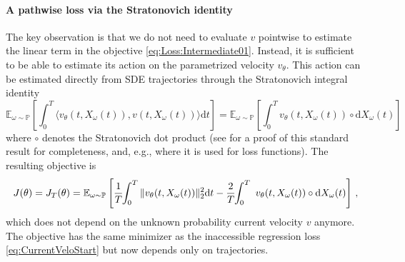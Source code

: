 \documentclass[oneside,11pt]{article}
\theoremstyle{remark}
\begin{document}
\paragraph{A pathwise loss via the Stratonovich identity}
The key observation is that we do not need to evaluate $v$ pointwise to estimate the linear term in the objective \eqref{eq:Loss:Intermediate01}. Instead, it is sufficient to be able to estimate its action on the parametrized velocity $v_{\theta}$. 
This action can be estimated directly from SDE trajectories through the Stratonovich integral identity
\begin{equation}\label{eq:StratExp}
\mathbb{E}_{\omega \sim \mathbb{P}} \left[\int_0^T \langle v_\theta(t, X_{\omega}(t)), v(t, X_{\omega}(t)) \rangle \mathrm{d} t\right] = \mathbb{E}_{\omega \sim \mathbb{P}} \left[ \int_0^T v_\theta(t, X_{\omega}(t)) \circ \mathrm{d} X_{\omega}(t) \right] 
\end{equation}
where $\circ$ denotes the Stratonovich dot product (see  for a proof of this standard result for completeness, and, e.g.,  \cite{frishman-ronceray:2020,boffi-vanden-eijnden:2025,lyu-ray-crutchfield:2025} where it is used for loss functions). 
The resulting objective is
\begin{equation}\label{eq:stratloss}
J(\theta) = J_T(\theta) = \mathbb{E}_{\omega \sim \mathbb{P}}\left[\frac{1}{T}\hspace*{-0.10cm}\int_0^T\|v_{\theta}(t, X_{\omega}(t))\|_2^2\mathrm dt - \frac{2}{T}\hspace*{-0.10cm}\int_0^T\ v_{\theta}(t, X_{\omega}(t)) \circ \mathrm dX_{\omega}(t)\right]\,,
\end{equation}
which does not depend on the unknown probability current velocity $v$ anymore. 
The objective has the same minimizer as the inaccessible regression loss \eqref{eq:CurrentVeloStart} but now depends only on trajectories. 
\end{document}
